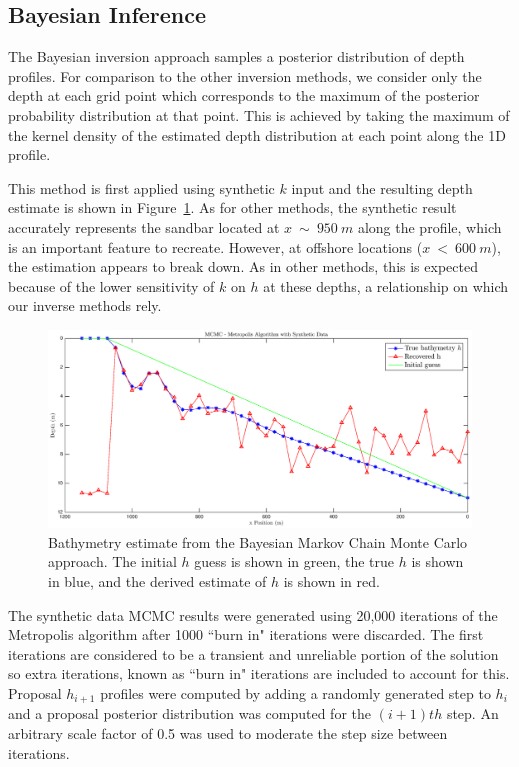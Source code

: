 \subsection{Bayesian Inference}
The Bayesian inversion approach samples a posterior distribution of depth profiles. For comparison to the other inversion methods, we consider only the depth at each grid point which corresponds to the maximum of the posterior probability distribution at that point. This is achieved by taking the maximum of the kernel density of the estimated depth distribution at each point along the 1D profile. 

This method is first applied using synthetic $k$ input and the resulting depth estimate is shown in Figure~\ref{mcmc-synthetic}. As for other methods, the synthetic result accurately represents the sandbar located at $x~\sim~950~m$ along the profile, which is an important feature to recreate. However, at offshore locations ($x~<~600~m$), the estimation appears to break down. As in other methods, this is expected because of the lower sensitivity of $k$ on $h$ at these depths, a relationship on which our inverse methods rely.

\begin{figure}[H]
\center
\includegraphics[scale=0.46]{img/MCMC-manufactured.eps} 
\caption{Bathymetry estimate from the Bayesian Markov Chain Monte Carlo approach. The initial $h$ guess is shown in green, the true $h$ is shown in blue, and the derived estimate of $h$ is shown in red.}
\label{mcmc-synthetic}
\end{figure}

The synthetic data MCMC results were generated using 20,000 iterations of the Metropolis algorithm after 1000 ``burn in" iterations were discarded. The first iterations are considered to be a transient and unreliable portion of the solution so extra iterations, known as ``burn in" iterations are included to account for this. Proposal $h_{i+1}$ profiles were computed by adding a randomly generated step to $h_i$ and a proposal posterior distribution was computed for the $(i+1)th$ step. An arbitrary scale factor of 0.5 was used to moderate the step size between iterations. 


